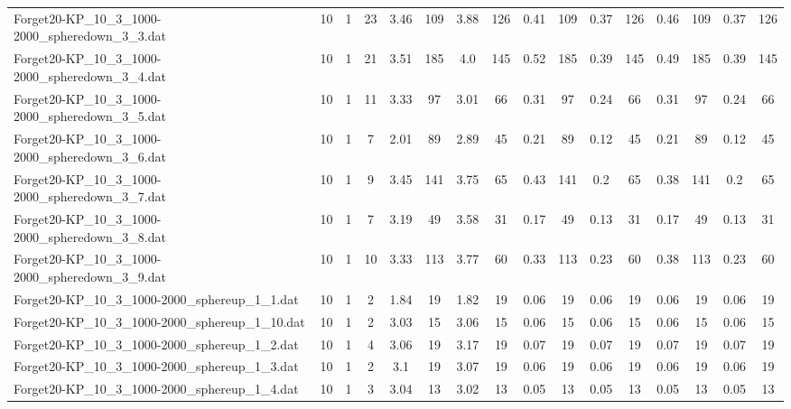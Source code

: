 \begin{sidewaystable}[!ht]
{\begin{tabular}{lccccccccccccccc}
Forget20-KP\_10\_3\_1000-2000\_spheredown\_3\_3.dat & 10 & 1 & 23 & 3.46 & 109 & 3.88 & 126 & 0.41 & 109 &  \textcolor{blue2}{0.37} & 126 & 0.46 & 109 &  \textcolor{blue2}{0.37} & 126 \\
Forget20-KP\_10\_3\_1000-2000\_spheredown\_3\_4.dat & 10 & 1 & 21 & 3.51 & 185 & 4.0 & 145 & 0.52 & 185 &  \textcolor{blue2}{0.39} & 145 & 0.49 & 185 &  \textcolor{blue2}{0.39} & 145 \\
Forget20-KP\_10\_3\_1000-2000\_spheredown\_3\_5.dat & 10 & 1 & 11 & 3.33 & 97 & 3.01 & 66 & 0.31 & 97 &  \textcolor{blue2}{0.24} & 66 & 0.31 & 97 &  \textcolor{blue2}{0.24} & 66 \\
Forget20-KP\_10\_3\_1000-2000\_spheredown\_3\_6.dat & 10 & 1 & 7 & 2.01 & 89 & 2.89 & 45 & 0.21 & 89 &  \textcolor{blue2}{0.12} & 45 & 0.21 & 89 &  \textcolor{blue2}{0.12} & 45 \\
Forget20-KP\_10\_3\_1000-2000\_spheredown\_3\_7.dat & 10 & 1 & 9 & 3.45 & 141 & 3.75 & 65 & 0.43 & 141 &  \textcolor{blue2}{0.2} & 65 & 0.38 & 141 &  \textcolor{blue2}{0.2} & 65 \\
Forget20-KP\_10\_3\_1000-2000\_spheredown\_3\_8.dat & 10 & 1 & 7 & 3.19 & 49 & 3.58 & 31 & 0.17 & 49 &  \textcolor{blue2}{0.13} & 31 & 0.17 & 49 &  \textcolor{blue2}{0.13} & 31 \\
Forget20-KP\_10\_3\_1000-2000\_spheredown\_3\_9.dat & 10 & 1 & 10 & 3.33 & 113 & 3.77 & 60 & 0.33 & 113 &  \textcolor{blue2}{0.23} & 60 & 0.38 & 113 &  \textcolor{blue2}{0.23} & 60 \\
Forget20-KP\_10\_3\_1000-2000\_sphereup\_1\_1.dat & 10 & 1 & 2 & 1.84 & 19 & 1.82 & 19 &  \textcolor{blue2}{0.06} & 19 &  \textcolor{blue2}{0.06} & 19 &  \textcolor{blue2}{0.06} & 19 &  \textcolor{blue2}{0.06} & 19 \\
Forget20-KP\_10\_3\_1000-2000\_sphereup\_1\_10.dat & 10 & 1 & 2 & 3.03 & 15 & 3.06 & 15 &  \textcolor{blue2}{0.06} & 15 &  \textcolor{blue2}{0.06} & 15 &  \textcolor{blue2}{0.06} & 15 &  \textcolor{blue2}{0.06} & 15 \\
Forget20-KP\_10\_3\_1000-2000\_sphereup\_1\_2.dat & 10 & 1 & 4 & 3.06 & 19 & 3.17 & 19 &  \textcolor{blue2}{0.07} & 19 &  \textcolor{blue2}{0.07} & 19 &  \textcolor{blue2}{0.07} & 19 &  \textcolor{blue2}{0.07} & 19 \\
Forget20-KP\_10\_3\_1000-2000\_sphereup\_1\_3.dat & 10 & 1 & 2 & 3.1 & 19 & 3.07 & 19 &  \textcolor{blue2}{0.06} & 19 &  \textcolor{blue2}{0.06} & 19 &  \textcolor{blue2}{0.06} & 19 &  \textcolor{blue2}{0.06} & 19 \\
Forget20-KP\_10\_3\_1000-2000\_sphereup\_1\_4.dat & 10 & 1 & 3 & 3.04 & 13 & 3.02 & 13 &  \textcolor{blue2}{0.05} & 13 &  \textcolor{blue2}{0.05} & 13 &  \textcolor{blue2}{0.05} & 13 &  \textcolor{blue2}{0.05} & 13 \\

\end{tabular}}
\end{sidewaystable}
